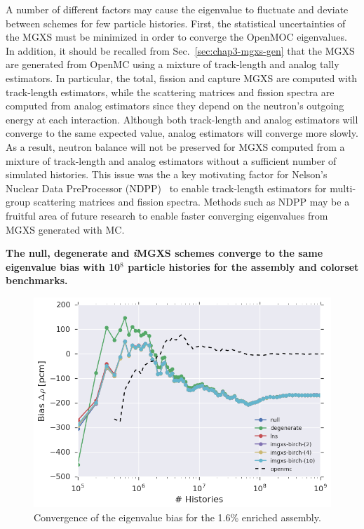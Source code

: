 A number of different factors may cause the eigenvalue to fluctuate and deviate between schemes for few particle histories. First, the statistical uncertainties of the \ac{MGXS} must be minimized in order to converge the OpenMOC eigenvalues. In addition, it should be recalled from Sec.~\ref{sec:chap3-mgxs-gen} that the \ac{MGXS} are generated from OpenMC using a mixture of track-length and analog tally estimators. In particular, the total, fission and capture \ac{MGXS} are computed with track-length estimators, while the scattering matrices and fission spectra are computed from analog estimators since they depend on the neutron's outgoing energy at each interaction. Although both track-length and analog estimators will converge to the same expected value, analog estimators will converge more slowly. As a result, neutron balance will not be preserved for \ac{MGXS} computed from a mixture of track-length and analog estimators without a sufficient number of simulated histories. This issue was the a key motivating factor for Nelson's Nuclear Data PreProcessor (NDPP)~\cite{nelson2014improved} to enable track-length estimators for multi-group scattering matrices and fission spectra. Methods  such as NDPP may be a fruitful area of future research to enable faster converging eigenvalues from \ac{MGXS} generated with \ac{MC}.

\begin{emphbox}
\textbf{The null, degenerate and \textit{i}\ac{MGXS} schemes converge to the same eigenvalue bias with 10$^{8}$ particle histories for the assembly and colorset benchmarks.}
\end{emphbox}


\begin{figure}[h!]
\centering
\includegraphics[width=0.88\linewidth]{figures/results/convergence/assm-16/keff-bias-evo}
\vspace{2mm}
\caption[Eigenvalue bias convergence with MC histories]{Convergence of the eigenvalue bias for the 1.6\% enriched assembly.}
\label{fig:chap11-assm-1.6-eigenvalue-converge}
\end{figure}

